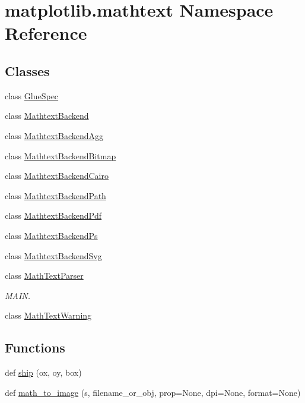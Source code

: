 \hypertarget{namespacematplotlib_1_1mathtext}{}\section{matplotlib.\+mathtext Namespace Reference}
\label{namespacematplotlib_1_1mathtext}
\subsection*{Classes}
\begin{DoxyCompactItemize}
\item 
class \hyperlink{classmatplotlib_1_1mathtext_1_1GlueSpec}{Glue\+Spec}
\item 
class \hyperlink{classmatplotlib_1_1mathtext_1_1MathtextBackend}{Mathtext\+Backend}
\item 
class \hyperlink{classmatplotlib_1_1mathtext_1_1MathtextBackendAgg}{Mathtext\+Backend\+Agg}
\item 
class \hyperlink{classmatplotlib_1_1mathtext_1_1MathtextBackendBitmap}{Mathtext\+Backend\+Bitmap}
\item 
class \hyperlink{classmatplotlib_1_1mathtext_1_1MathtextBackendCairo}{Mathtext\+Backend\+Cairo}
\item 
class \hyperlink{classmatplotlib_1_1mathtext_1_1MathtextBackendPath}{Mathtext\+Backend\+Path}
\item 
class \hyperlink{classmatplotlib_1_1mathtext_1_1MathtextBackendPdf}{Mathtext\+Backend\+Pdf}
\item 
class \hyperlink{classmatplotlib_1_1mathtext_1_1MathtextBackendPs}{Mathtext\+Backend\+Ps}
\item 
class \hyperlink{classmatplotlib_1_1mathtext_1_1MathtextBackendSvg}{Mathtext\+Backend\+Svg}
\item 
class \hyperlink{classmatplotlib_1_1mathtext_1_1MathTextParser}{Math\+Text\+Parser}
\begin{DoxyCompactList}\small\item\em M\+A\+IN. \end{DoxyCompactList}\item 
class \hyperlink{classmatplotlib_1_1mathtext_1_1MathTextWarning}{Math\+Text\+Warning}
\end{DoxyCompactItemize}
\subsection*{Functions}
\begin{DoxyCompactItemize}
\item 
def \hyperlink{namespacematplotlib_1_1mathtext_abe5b6c35a0a4cbd99b0f5fa7e2f980ff}{ship} (ox, oy, box)
\item 
def \hyperlink{namespacematplotlib_1_1mathtext_ae8a4548aa1fd9ca4572dba4a1aea17ae}{math\+\_\+to\+\_\+image} (s, filename\+\_\+or\+\_\+obj, prop=None, dpi=None, format=None)
\end{DoxyCompactItemize}
